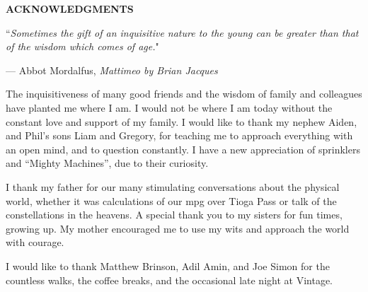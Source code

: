 \documentclass[12pt,notitlepage]{report}
\begin{document}
\tableofcontents

\afterpreface

\newpage

\begin{center}
{\Large \bf ACKNOWLEDGMENTS}
\end{center}


\singlespace
\epigraph{``\emph{Sometimes the gift of an inquisitive nature to the young can be greater than that of the wisdom which comes of age.}"}{--- \textup{Abbot Mordalfus}, \textit{Mattimeo by Brian Jacques}}

\dblspace

The inquisitiveness of many good friends and the wisdom of family and colleagues have planted me where I am.
I would not be where I am today without the constant love and support of my family. 
I would like to thank my nephew Aiden, and Phil's sons Liam and Gregory, for teaching me to approach everything with an open mind, and to question constantly.
I have a new appreciation of sprinklers and ``Mighty Machines'', due to their curiosity.

I thank my father for our many stimulating conversations about the physical world, whether it was calculations of our mpg over Tioga Pass or talk of the constellations in the heavens. %
A special thank you to my sisters for fun times, growing up. 
My mother encouraged me to use my wits and approach the world with courage.

I would like to thank Matthew Brinson, Adil Amin, and Joe Simon for the countless walks, the coffee breaks, and the occasional late night at Vintage. 
\end{document}
